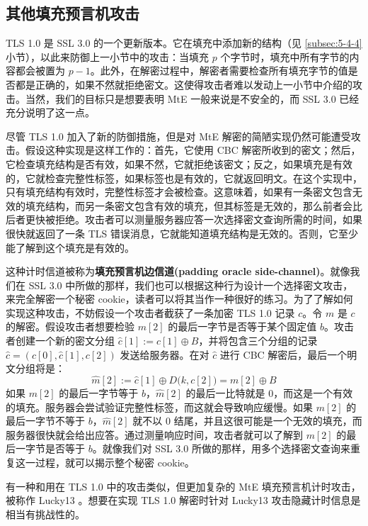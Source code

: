\subsection{其他填充预言机攻击}\label{subsec:9-4-3}

TLS 1.0 是 SSL 3.0 的一个更新版本。它在填充中添加新的结构（见 \ref{subsec:5-4-4} 小节），以此来防御上一小节中的攻击：当填充 $p$ 个字节时，填充中所有字节的内容都会被置为 $p-1$。此外，在解密过程中，解密者需要检查所有填充字节的值是否都是正确的，如果不然就拒绝密文。这使得攻击者难以发动上一小节中介绍的攻击。当然，我们的目标只是想要表明 MtE 一般来说是不安全的，而 SSL 3.0 已经充分说明了这一点。

\begin{snote}[一种填充预言机计时攻击。]
尽管 TLS 1.0 加入了新的防御措施，但是对 MtE 解密的简陋实现仍然可能遭受攻击。假设这种实现是这样工作的：首先，它使用 CBC 解密所收到的密文；然后，它检查填充结构是否有效，如果不然，它就拒绝该密文；反之，如果填充是有效的，它就检查完整性标签，如果标签也是有效的，它就返回明文。在这个实现中，只有填充结构有效时，完整性标签才会被检查。这意味着，如果有一条密文包含无效的填充结构，而另一条密文包含有效的填充，但其标签是无效的，那么前者会比后者更快被拒绝。攻击者可以测量服务器应答一次选择密文查询所需的时间，如果很快就返回了一条 TLS 错误消息，它就能知道填充结构是无效的。否则，它至少能了解到这个填充是有效的。

这种计时信道被称为\textbf{填充预言机边信道(padding oracle side-channel)}。就像我们在 SSL 3.0 中所做的那样，我们也可以根据这种行为设计一个选择密文攻击，来完全解密一个秘密 cookie，读者可以将其当作一种很好的练习。为了了解如何实现这种攻击，不妨假设一个攻击者截获了一条加密 TLS 1.0 记录 $c$。令 $m$ 是 $c$ 的解密。假设攻击者想要检验 $m[2]$ 的最后一字节是否等于某个固定值 $b$。攻击者创建一个新的密文分组 $\hat{c}[1]:=c[1]\oplus B$，并将包含三个分组的记录 $\hat{c}=(c[0],\hat{c}[1],c[2])$ 发送给服务器。在对 $\hat{c}$ 进行 CBC 解密后，最后一个明文分组将是：
\[
\hat{m}[2]
:=\hat{c}[1]\oplus D\big(k,c[2]\big)
=m[2]\oplus B
\]
如果 $m[2]$ 的最后一字节等于 $b$，$\hat{m}[2]$ 的最后一比特就是 $0$，而这是一个有效的填充。服务器会尝试验证完整性标签，而这就会导致响应缓慢。如果 $m[2]$ 的最后一字节不等于 $b$，$\hat{m}[2]$ 就不以 $0$ 结尾，并且这很可能是一个无效的填充，而服务器很快就会给出应答。通过测量响应时间，攻击者就可以了解到 $m[2]$ 的最后一字节是否等于 $b$。就像我们对 SSL 3.0 所做的那样，用多个选择密文查询来重复这一过程，就可以揭示整个秘密 cookie。

有一种和用在 TLS 1.0 中的攻击类似，但更加复杂的 MtE 填充预言机计时攻击，被称作 Lucky13 \cite{al2013lucky}。想要在实现 TLS 1.0 解密时针对 Lucky13 攻击隐藏计时信息是相当有挑战性的。
\end{snote}

